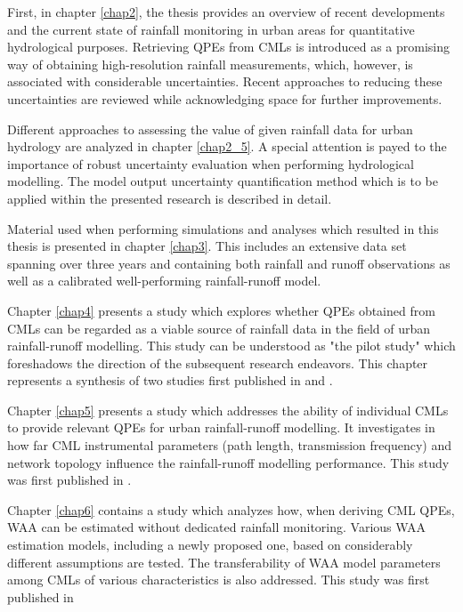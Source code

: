 \documentclass{ctuthesis}\usepackage[]{graphicx}\usepackage[]{color}
\begin{document}
First, in chapter \ref{chap2}, the thesis provides an overview of recent developments and the current state of rainfall monitoring in urban areas for quantitative hydrological purposes. Retrieving QPEs from CMLs is introduced as a promising way of obtaining high-resolution rainfall measurements, which, however, is associated with considerable uncertainties. Recent approaches to reducing these uncertainties are reviewed while acknowledging space for further improvements.

Different approaches to assessing the value of given rainfall data for urban hydrology are analyzed in chapter \ref{chap2_5}. A special attention is payed to the importance of robust uncertainty evaluation when performing hydrological modelling. The model output uncertainty quantification method which is to be applied within the presented research is described in detail. 

Material used when performing simulations and analyses which resulted in this thesis is presented in chapter \ref{chap3}. This includes an extensive data set spanning over three years and containing both rainfall and runoff observations as well as a calibrated well-performing rainfall-runoff model.

Chapter \ref{chap4} presents a study which explores whether QPEs obtained from CMLs can be regarded as a viable source of rainfall data in the field of urban rainfall-runoff modelling. This study can be understood as "the pilot study" which foreshadows the direction of the subsequent research endeavors. This chapter represents a synthesis of two studies first published in \cite{pastorekReliabilityMicrowaveLink2017} and \cite{pastorekPosouzeniSrazkovychDat2018}.

Chapter \ref{chap5} presents a study which addresses the ability of individual CMLs to provide relevant QPEs for urban rainfall-runoff modelling. It investigates in how far CML instrumental parameters (path length, transmission frequency) and network topology influence the rainfall-runoff modelling performance. This study was first published in \cite{pastorekCommercialMicrowaveLinks2019}.

Chapter \ref{chap6} contains a study which analyzes how, when deriving CML QPEs, WAA can be estimated without dedicated rainfall monitoring. Various WAA estimation models, including a newly proposed one, based on considerably different assumptions are tested. The transferability of WAA model parameters among CMLs of various characteristics is also addressed. This study was first published in \cite{pastorekPrecipitationEstimatesCommercial2022}
\end{document}
